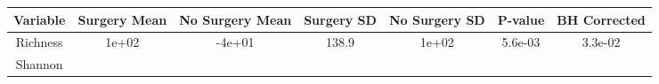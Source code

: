 \documentclass[12pt,]{article}
\begin{document}
\begin{longtable}[]{@{}ccccccc@{}}
\toprule
\begin{minipage}[b]{0.26\columnwidth}\centering\strut
Variable\strut
\end{minipage} & \begin{minipage}[b]{0.09\columnwidth}\centering\strut
Surgery Mean\strut
\end{minipage} & \begin{minipage}[b]{0.11\columnwidth}\centering\strut
No Surgery Mean\strut
\end{minipage} & \begin{minipage}[b]{0.08\columnwidth}\centering\strut
Surgery SD\strut
\end{minipage} & \begin{minipage}[b]{0.10\columnwidth}\centering\strut
No Surgery SD\strut
\end{minipage} & \begin{minipage}[b]{0.07\columnwidth}\centering\strut
P-value\strut
\end{minipage} & \begin{minipage}[b]{0.09\columnwidth}\centering\strut
BH Corrected\strut
\end{minipage}\tabularnewline
\midrule
\endhead
\begin{minipage}[t]{0.26\columnwidth}\centering\strut
Richness\strut
\end{minipage} & \begin{minipage}[t]{0.09\columnwidth}\centering\strut
1e+02\strut
\end{minipage} & \begin{minipage}[t]{0.11\columnwidth}\centering\strut
-4e+01\strut
\end{minipage} & \begin{minipage}[t]{0.08\columnwidth}\centering\strut
138.9\strut
\end{minipage} & \begin{minipage}[t]{0.10\columnwidth}\centering\strut
1e+02\strut
\end{minipage} & \begin{minipage}[t]{0.07\columnwidth}\centering\strut
5.6e-03\strut
\end{minipage} & \begin{minipage}[t]{0.09\columnwidth}\centering\strut
3.3e-02\strut
\end{minipage}\tabularnewline
\begin{minipage}[t]{0.26\columnwidth}\centering\strut
Shannon\strut
\end{minipage} & \begin{minipage}[t]{0.09\columnwidth}\centering\strut

\end{minipage}
\end{longtable}
\end{document}
